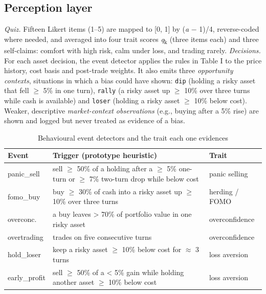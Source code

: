 \documentclass[conference]{IEEEtran}
\begin{document}
\subsection{Perception layer}
\textit{Quiz.} Fifteen Likert items (1--5) are mapped to [0, 1] by (\textit{a} \ensuremath{-} 1)/4, reverse-coded where needed, and averaged into four trait scores \textit{q}\textsubscript{k} (three items each) and three self-claims: comfort with high risk, calm under loss, and trading rarely. \textit{Decisions.} For each asset decision, the event detector applies the rules in Table I to the price history, cost basis and post-trade weights. It also emits three \textit{opportunity contexts}, situations in which a bias could have shown: \texttt{dip} (holding a risky asset that fell \ensuremath{\geq} 5\% in one turn), \texttt{rally} (a risky asset up \ensuremath{\geq} 10\% over three turns while cash is available) and \texttt{loser} (holding a risky asset \ensuremath{\geq} 10\% below cost). Weaker, descriptive \textit{market-context observations} (e.g., buying after a 5\% rise) are shown and logged but never treated as evidence of a bias.

\begin{table}[t]
\caption{Behavioural event detectors and the trait each one evidences}
\centering
\footnotesize
\setlength{\tabcolsep}{3pt}
\begin{tabular}{>{\raggedright\arraybackslash}p{}>{\raggedright\arraybackslash}p{}>{\raggedright\arraybackslash}p{}}
\hline
\textbf{Event} & \textbf{Trigger (prototype heuristic)} & \textbf{Trait} \\ \hline
panic\_sell & sell \ensuremath{\geq} 50\% of a holding after a \ensuremath{\geq} 5\% one-turn or \ensuremath{\geq} 7\% two-turn drop while below cost & panic selling \\
fomo\_buy & buy \ensuremath{\geq} 30\% of cash into a risky asset up \ensuremath{\geq} 10\% over three turns & herding / FOMO \\
overconc. & a buy leaves \textgreater{} 70\% of portfolio value in one risky asset & overconfidence \\
overtrading & trades on five consecutive turns & overconfidence \\
hold\_loser & keep a risky asset \ensuremath{\geq} 10\% below cost for \ensuremath{\approx} 3 turns & loss aversion \\
early\_profit & sell \ensuremath{\geq} 50\% of a \textless{} 5\% gain while holding another asset \ensuremath{\geq} 10\% below cost & loss aversion \\
\hline
\end{tabular}
\end{table}
\end{document}
